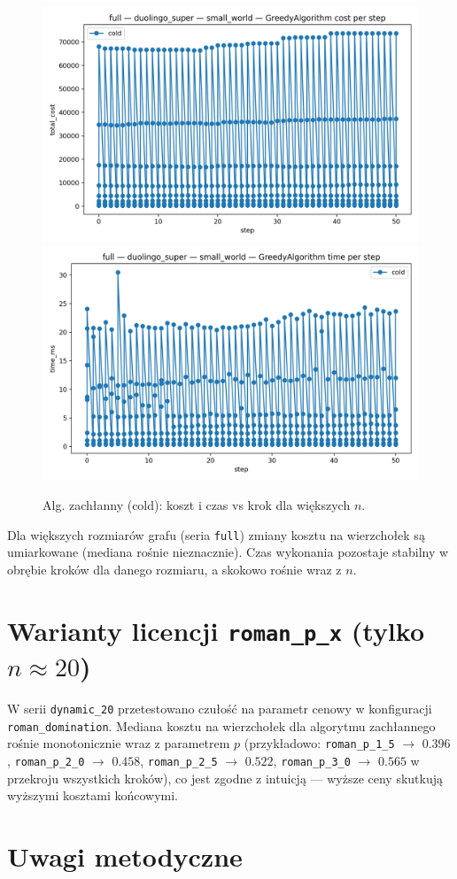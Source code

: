 \begin{figure}[H]
  \centering
  \includegraphics[width=0.48\linewidth]{assets/figures/dynamic/full/duolingo_super/small_world/GreedyAlgorithm_cost_per_step.png}
  \includegraphics[width=0.48\linewidth]{assets/figures/dynamic/full/duolingo_super/small_world/GreedyAlgorithm_time_per_step.png}
  \caption{Alg. zachłanny (cold): koszt i czas vs krok dla większych $n$.}
  \label{fig:full_duo_greedy}
\end{figure}

Dla większych rozmiarów grafu (seria \texttt{full}) zmiany kosztu na wierzchołek są umiarkowane (mediana rośnie nieznacznie). Czas wykonania pozostaje stabilny w obrębie kroków dla danego rozmiaru, a skokowo rośnie wraz z $n$.

\section{Warianty licencji \texttt{roman\_p\_x} (tylko $n\approx20$)}

W serii \texttt{dynamic\_20} przetestowano czułość na parametr cenowy w konfiguracji \texttt{roman\_domination}. Mediana kosztu na wierzchołek dla algorytmu zachłannego rośnie monotonicznie wraz z parametrem $p$ (przykładowo: \texttt{roman\_p\_1\_5} $\to$ $0.396$, \texttt{roman\_p\_2\_0} $\to$ $0.458$, \texttt{roman\_p\_2\_5} $\to$ $0.522$, \texttt{roman\_p\_3\_0} $\to$ $0.565$ w przekroju wszystkich kroków), co jest zgodne z intuicją — wyższe ceny skutkują wyższymi kosztami końcowymi.

\section{Uwagi metodyczne}

